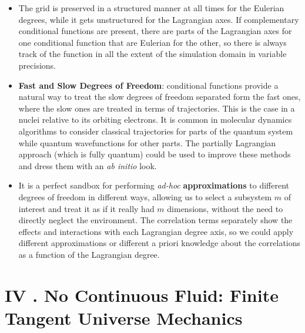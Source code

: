 \documentclass[11pt, a4paper]{article} %
\begin{document}
\begin{itemize}
\item The grid is preserved in a structured manner at all times for the Eulerian degrees, while it gets unstructured for the Lagrangian axes. If complementary conditional functions are present, there are parts of the Lagrangian axes for one conditional function that are Eulerian for the other, so there is always track of the function in all the extent of the simulation domain in variable precisions.
\item {\bf Fast and Slow Degrees of Freedom}: conditional functions provide a natural way to treat the slow degrees of freedom separated form the fast ones, where the slow ones are treated in terms of trajectories. This is the case in a nuclei relative to its orbiting electrons. It is common in molecular dynamics algorithms to consider classical trajectories for parts of the quantum system while quantum wavefunctions for other parts. The partially Lagrangian approach (which is fully quantum) could be used to improve these methods and dress them with an {\em ab initio} look.
\item It is a perfect sandbox for performing {\em ad-hoc} {\bf approximations} to different degrees of freedom in different ways, allowing us to select a subsystem $m$ of interest and treat it as if it really had $m$ dimensions, without the need to directly neglect the environment. The correlation terms separately show the effects and interactions with each Lagrangian degree axis, so we could apply different approximations or different a priori knowledge about the correlations as a function of the Lagrangian degree.
\end{itemize}




\newpage
\section*{IV . No Continuous Fluid: Finite Tangent Universe Mechanics}




 
\end{document}

